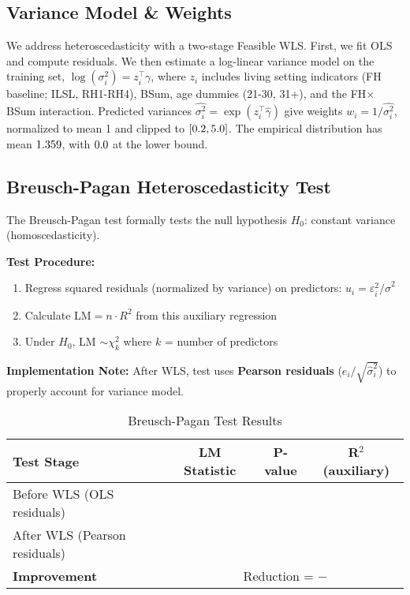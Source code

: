 \subsection*{Variance Model \& Weights}
We address heteroscedasticity with a two-stage Feasible WLS. First, we fit OLS and compute residuals. We then estimate a log-linear variance model on the training set,
$\log(\sigma_i^2) = z_i^\top \gamma$, where $z_i$ includes living setting indicators (FH baseline; ILSL, RH1-RH4), BSum, age dummies (21-30, 31+), and the FH$\times$BSum interaction. Predicted variances $\widehat{\sigma_i^2} = \exp(z_i^\top \widehat{\gamma})$ give weights $w_i = 1/\widehat{\sigma_i^2}$, normalized to mean 1 and clipped to $[0.2, 5.0]$. The empirical distribution has mean $1.359$, with $0.0$ at the lower bound.


\subsection{Breusch-Pagan Heteroscedasticity Test}

The Breusch-Pagan test formally tests the null hypothesis $H_0$: constant variance (homoscedasticity).

\textbf{Test Procedure:}
\begin{enumerate}
    \item Regress squared residuals (normalized by variance) on predictors: $u_i = \varepsilon_i^2 / \hat{\sigma}^2$
    \item Calculate $\text{LM} = n \cdot R^2$ from this auxiliary regression
    \item Under $H_0$, LM $\sim \chi^2_k$ where $k$ = number of predictors
\end{enumerate}

\textbf{Implementation Note:} After WLS, test uses \textbf{Pearson residuals} ($e_i / \sqrt{\hat{\sigma}_i^2}$) to properly account for variance model.

\begin{table}[h]
\centering
\caption{Breusch-Pagan Test Results}
\begin{tabular}{lccc}
\toprule
\textbf{Test Stage} & \textbf{LM Statistic} & \textbf{P-value} & \textbf{R$^2$ (auxiliary)} \\
\midrule
Before WLS (OLS residuals) & \ModelFourBreuschPagan{} & \ModelFourBreuschPaganPValue{} & \ModelFourBreuschPaganRTwo{} \\
After WLS (Pearson residuals) & \ModelFourBreuschPaganAfter{} & \ModelFourBreuschPaganPValueAfter{} & \ModelFourBreuschPaganRTwoAfter{} \\
\midrule
\textbf{Improvement} & \multicolumn{3}{c}{Reduction = \ModelFourBreuschPagan{} $-$ \ModelFourBreuschPaganAfter{}} \\
\bottomrule
\end{tabular}
\end{table}

